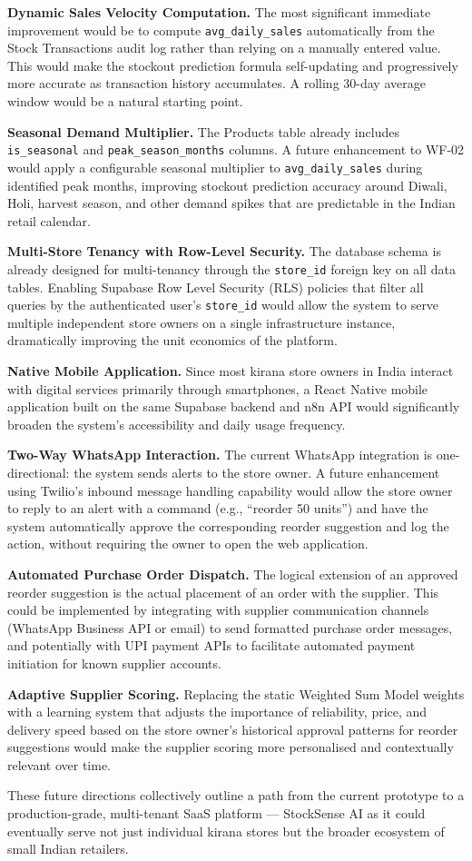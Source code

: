 \textbf{Dynamic Sales Velocity Computation.} The most significant immediate improvement
would be to compute \texttt{avg\_daily\_sales} automatically from the Stock Transactions
audit log rather than relying on a manually entered value. This would make the stockout
prediction formula self-updating and progressively more accurate as transaction history
accumulates. A rolling 30-day average window would be a natural starting point.

\textbf{Seasonal Demand Multiplier.} The Products table already includes \texttt{is\_seasonal}
and \texttt{peak\_season\_months} columns. A future enhancement to WF-02 would apply a
configurable seasonal multiplier to \texttt{avg\_daily\_sales} during identified peak months,
improving stockout prediction accuracy around Diwali, Holi, harvest season, and other
demand spikes that are predictable in the Indian retail calendar.

\textbf{Multi-Store Tenancy with Row-Level Security.} The database schema is already
designed for multi-tenancy through the \texttt{store\_id} foreign key on all data tables.
Enabling Supabase Row Level Security (RLS) policies that filter all queries by the
authenticated user's \texttt{store\_id} would allow the system to serve multiple independent
store owners on a single infrastructure instance, dramatically improving the unit economics
of the platform.

\textbf{Native Mobile Application.} Since most kirana store owners in India interact
with digital services primarily through smartphones, a React Native mobile application
built on the same Supabase backend and n8n API would significantly broaden the system's
accessibility and daily usage frequency.

\textbf{Two-Way WhatsApp Interaction.} The current WhatsApp integration is one-directional:
the system sends alerts to the store owner. A future enhancement using Twilio's inbound
message handling capability would allow the store owner to reply to an alert with a command
(e.g., ``reorder 50 units'') and have the system automatically approve the corresponding
reorder suggestion and log the action, without requiring the owner to open the web application.

\textbf{Automated Purchase Order Dispatch.} The logical extension of an approved reorder
suggestion is the actual placement of an order with the supplier. This could be implemented
by integrating with supplier communication channels (WhatsApp Business API or email) to
send formatted purchase order messages, and potentially with UPI payment APIs to facilitate
automated payment initiation for known supplier accounts.

\textbf{Adaptive Supplier Scoring.} Replacing the static Weighted Sum Model weights with
a learning system that adjusts the importance of reliability, price, and delivery speed
based on the store owner's historical approval patterns for reorder suggestions would make
the supplier scoring more personalised and contextually relevant over time.

These future directions collectively outline a path from the current prototype to a
production-grade, multi-tenant SaaS platform — StockSense AI as it could eventually serve
not just individual kirana stores but the broader ecosystem of small Indian retailers.
